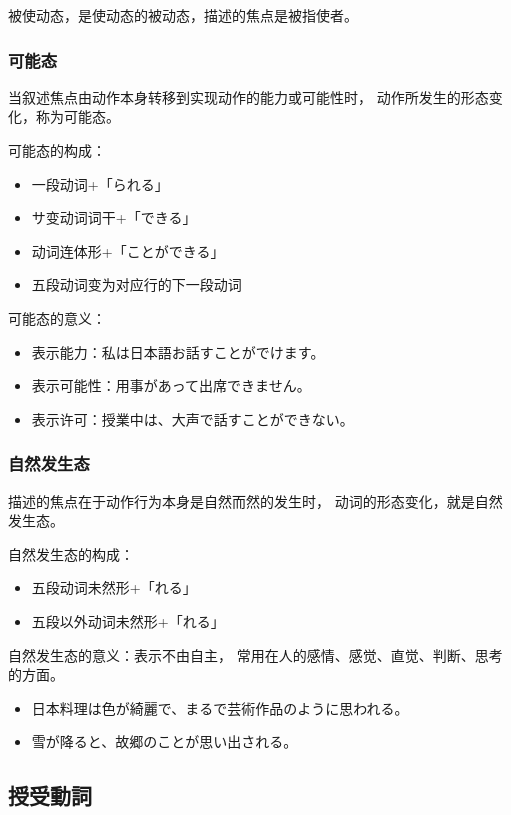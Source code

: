 被使动态，是使动态的被动态，描述的焦点是被指使者。


\subsubsection{可能态}%

当叙述焦点由动作本身转移到实现动作的能力或可能性时，
动作所发生的形态变化，称为可能态。

可能态的构成：
\begin{itemize}
  \item 一段动词+「られる」
  \item サ变动词词干+「できる」
  \item 动词连体形+「ことができる」
  \item 五段动词变为对应行的下一段动词
\end{itemize}

可能态的意义：
\begin{itemize}
  \item 表示能力：私は日本語お話すことがでけます。
  \item 表示可能性：用事があって出席できません。
  \item 表示许可：授業中は、大声で話すことができない。
\end{itemize}


\subsubsection{自然发生态}%

描述的焦点在于动作行为本身是自然而然的发生时，
动词的形态变化，就是自然发生态。

自然发生态的构成：
\begin{itemize}
  \item 五段动词未然形+「れる」
  \item 五段以外动词未然形+「れる」
\end{itemize}

自然发生态的意义：表示不由自主，
常用在人的感情、感觉、直觉、判断、思考的方面。
\begin{itemize}
  \item 日本料理は色が綺麗で、まるで芸術作品のように思われる。
  \item 雪が降ると、故郷のことが思い出される。
\end{itemize}



\subsection{授受動詞}%

